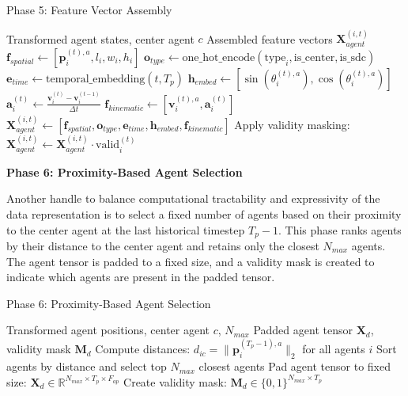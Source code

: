 \begin{algorithm}[H]
\caption{Phase 5: Feature Vector Assembly}
\label{alg:phase5_features}
\begin{algorithmic}[1]
\REQUIRE Transformed agent states, center agent $c$
\ENSURE Assembled feature vectors $\boldsymbol{X}_{agent}^{(i,t)}$
    \STATE $\boldsymbol{f}_{spatial} \leftarrow [\boldsymbol{p}_i^{(t),a}, l_i, w_i, h_i]$
    \STATE $\boldsymbol{o}_{type} \leftarrow \text{one\_hot\_encode}(\text{type}_i, \text{is\_center}, \text{is\_sdc})$
    \STATE $\boldsymbol{e}_{time} \leftarrow \text{temporal\_embedding}(t, T_p)$ 
    \STATE $\boldsymbol{h}_{embed} \leftarrow [\sin(\theta_i^{(t),a}), \cos(\theta_i^{(t),a})]$
    \STATE $\boldsymbol{a}_i^{(t)} \leftarrow \frac{\boldsymbol{v}_i^{(t)} - \boldsymbol{v}_i^{(t-1)}}{\Delta t}$ 
    \STATE $\boldsymbol{f}_{kinematic} \leftarrow [\boldsymbol{v}_i^{(t),a}, \boldsymbol{a}_i^{(t)}]$
    \STATE $\boldsymbol{X}_{agent}^{(i,t)} \leftarrow [\boldsymbol{f}_{spatial}, \boldsymbol{o}_{type}, \boldsymbol{e}_{time}, \boldsymbol{h}_{embed}, \boldsymbol{f}_{kinematic}]$
    \STATE Apply validity masking: $\boldsymbol{X}_{agent}^{(i,t)} \leftarrow \boldsymbol{X}_{agent}^{(i,t)} \cdot \text{valid}_i^{(t)}$
\ENDFOR
\end{algorithmic}
\end{algorithm}

\textbf{Phase 6: Proximity-Based Agent Selection}

Another handle to balance computational tractability and expressivity of the data representation is to select a fixed number of agents based on their proximity to the center agent at the last historical timestep $T_p-1$. This phase ranks agents by their distance to the center agent and retains only the closest $N_{max}$ agents. The agent tensor is padded to a fixed size, and a validity mask is created to indicate which agents are present in the padded tensor.

\begin{algorithm}[H]
\caption{Phase 6: Proximity-Based Agent Selection}
\label{alg:phase6_proximity}
\begin{algorithmic}[1]
\REQUIRE Transformed agent positions, center agent $c$, $N_{max}$
\ENSURE Padded agent tensor $\boldsymbol{X}_d$, validity mask $\boldsymbol{M}_d$
\STATE Compute distances: $d_{ic} = \|\boldsymbol{p}_i^{(T_p-1),a}\|_2$ for all agents $i$
\STATE Sort agents by distance and select top $N_{max}$ closest agents
\STATE Pad agent tensor to fixed size: $\boldsymbol{X}_d \in \mathbb{R}^{N_{max} \times T_p \times F_{ap}}$
\STATE Create validity mask: $\boldsymbol{M}_d \in \{0,1\}^{N_{max} \times T_p}$
\end{algorithmic}
\end{algorithm}

